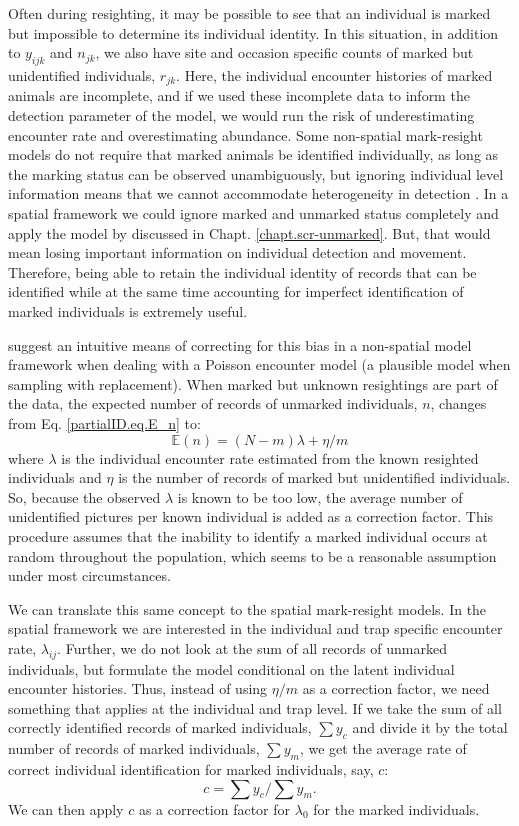 Often during resighting, it may be possible to see that an individual
is marked but impossible to determine its individual identity. In this
situation, in addition to $y_{ijk}$ and $n_{jk}$, we also have
site and occasion specific counts of marked but unidentified
individuals, $r_{jk}$. Here, the individual encounter histories of
marked animals are incomplete, and if we used these incomplete data to
inform the detection parameter of the model, we would run the risk of
underestimating
encounter rate and overestimating
abundance. Some non-spatial mark-resight models do not require that
marked animals be identified individually, as long as the marking
status can be observed unambiguously, but ignoring individual level
information means that we cannot accommodate heterogeneity in
detection \citep{mcclintock_white:2010}. In a spatial framework we
could ignore marked and unmarked status completely and apply the model
by \citet{chandler_royle:2012} discussed in
Chapt. \ref{chapt.scr-unmarked}. But, that would mean losing important
information on individual detection and movement. Therefore, being
able to retain the individual identity of records that can be
identified while at the same time accounting for imperfect
identification of marked individuals is extremely useful.

\citet{mcclintock_etal:2009biometrics,mcclintock_etal:2009mdp} suggest
an intuitive means of correcting for this bias in a non-spatial model
framework when dealing with a Poisson encounter model
(a plausible
model when sampling
with replacement). When marked but unknown resightings are part of the
data, the expected number of records of unmarked individuals, $n$, changes from Eq. \ref{partialID.eq.E_n} to:
\[
\mathbb{E}(n) = (N-m) { \lambda  + \eta/m}
\]
where $\lambda$ is the individual encounter rate estimated from the known resighted individuals and $\eta$ is the number of records of marked but unidentified individuals. So, because the observed $\lambda$ is known to be too low, the average number of unidentified pictures per known individual is added as a correction factor. This procedure assumes that the inability to identify a marked individual occurs at random throughout the population, which seems to be a reasonable assumption under most circumstances.


We can translate this same concept to the spatial mark-resight
models. In the spatial framework we are interested in the individual
and trap specific encounter rate, $\lambda_{ij}$. Further, we do not
look at the sum of all records of unmarked individuals, but formulate
the model conditional on the latent individual encounter
histories. Thus, instead of using $\eta/m$ as a correction factor, we
need something that applies at the individual and trap level. If we
take the sum of all correctly identified records of marked
individuals, $\sum y_c$ and divide it by the total number of records
of marked individuals, $\sum y_m$, we get the average rate of correct
individual identification for marked individuals, say, $c$:
\[
c = \sum y_c/\sum y_m.
\]
We can then apply $c$ as a correction factor for $\lambda_0$ for the marked individuals.

